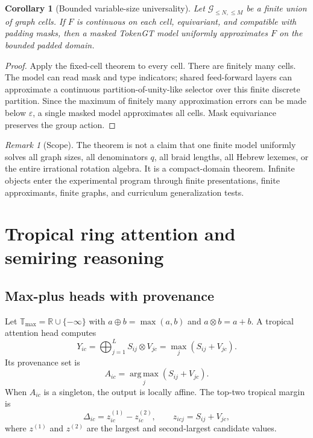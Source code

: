 \documentclass[11pt]{article}
\theoremstyle{definition}
\theoremstyle{plain}
\newtheorem{corollary}[definition]{Corollary}
\theoremstyle{remark}
\newtheorem{remark}[definition]{Remark}
\numberwithin{equation}{section}
\newcommand{\R}{\mathbb{R}}
\newcommand{\T}{\mathbb{T}}
\newcommand{\G}{\mathcal{G}}
\newcommand{\argmax}{\operatorname*{arg\,max}}
\begin{document}
\begin{corollary}[Bounded variable-size universality]
Let $\G_{\le N,\le M}$ be a finite union of graph cells.  If $F$ is continuous on each cell, equivariant, and compatible with padding masks, then a masked TokenGT model uniformly approximates $F$ on the bounded padded domain.
\end{corollary}

\begin{proof}
Apply the fixed-cell theorem to every cell.  There are finitely many cells.  The model can read mask and type indicators; shared feed-forward layers can approximate a continuous partition-of-unity-like selector over this finite discrete partition.  Since the maximum of finitely many approximation errors can be made below $\varepsilon$, a single masked model approximates all cells.  Mask equivariance preserves the group action.
\end{proof}

\begin{remark}[Scope]
The theorem is not a claim that one finite model uniformly solves all graph sizes, all denominators $q$, all braid lengths, all Hebrew lexemes, or the entire irrational rotation algebra.  It is a compact-domain theorem.  Infinite objects enter the experimental program through finite presentations, finite approximants, finite graphs, and curriculum generalization tests.
\end{remark}

\section{Tropical ring attention and semiring reasoning}

\subsection{Max-plus heads with provenance}

Let $\T_{\max}=\R\cup\{-\infty\}$ with $a\oplus b=\max(a,b)$ and $a\otimes b=a+b$.  A tropical attention head computes
\begin{equation}
  Y_{ic}=\bigoplus_{j=1}^L S_{ij}\otimes V_{jc}=\max_j(S_{ij}+V_{jc}).
\end{equation}
Its provenance set is
\begin{equation}
  A_{ic}=\argmax_j(S_{ij}+V_{jc}).
\end{equation}
When $A_{ic}$ is a singleton, the output is locally affine.  The top-two tropical margin is
\begin{equation}
  \Delta_{ic}=z_{ic}^{(1)}-z_{ic}^{(2)},\qquad z_{icj}=S_{ij}+V_{jc},
\end{equation}
where $z^{(1)}$ and $z^{(2)}$ are the largest and second-largest candidate values.
\end{document}
